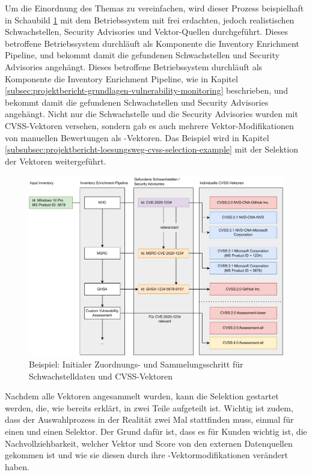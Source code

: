 Um die Einordnung des Themas zu vereinfachen, wird dieser Prozess beispielhaft in Schaubild \ref{fig:cvss-selection-process-collection} mit dem Betriebssystem  mit frei erdachten, jedoch realistischen Schwachstellen, Security Advisories und Vektor-Quellen durchgeführt.
\ifshortenedReport
Dieses betroffene Betriebssystem durchläuft als Komponente die Inventory Enrichment Pipeline, und bekommt damit die gefundenen Schwachstellen und Security Advisories angehängt.
\else
Dieses betroffene Betriebssystem durchläuft als Komponente die Inventory Enrichment Pipeline, wie in Kapitel \ref{subsec:projektbericht-grundlagen-vulnerability-monitoring} beschrieben, und bekommt damit die gefundenen Schwachstellen und Security Advisories angehängt.
\fi
Nicht nur die Schwachstelle und die Security Advisories wurden mit CVSS-Vektoren versehen, sondern gab es auch mehrere Vektor-Modifikationen von manuellen Bewertungen als -Vektoren.
Das Beispiel wird in Kapitel \ref{subsubsec:projektbericht-loesungsweg-cvss-selection-example} mit der Selektion der Vektoren weitergeführt.

\begin{figure}[htbp] %
    \centering
    \includegraphics[width=1\textwidth, keepaspectratio]{res/grafiken/cvss-selection-process-collection}
    \caption{Beispiel: Initialer Zuordnungs- und Sammelungsschritt für Schwachstelldaten und CVSS-Vektoren}
    \label{fig:cvss-selection-process-collection}
\end{figure}

Nachdem alle Vektoren angesammelt wurden, kann die Selektion gestartet werden, die, wie bereits erklärt, in zwei Teile aufgeteilt ist.
Wichtig ist zudem, dass der Auswahlprozess in der Realität zwei Mal stattfinden muss, einmal für einen  und einen  Selektor.
Der Grund dafür ist, dass es für Kunden wichtig ist, die Nachvollziehbarkeit, welcher Vektor und Score von den externen Datenquellen gekommen ist und wie sie diesen durch ihre -Vektormodifikationen verändert haben.

